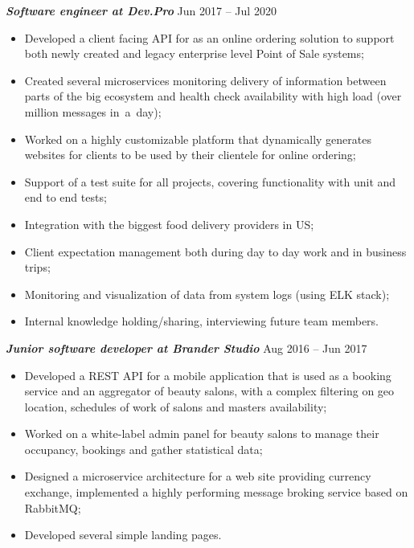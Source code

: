 \documentclass[margin, 10pt]{res} %
\begin{document}
\begin{resume}
{\sl \bf  Software engineer at Dev.Pro } \hfill Jun 2017 -- Jul 2020
\vspace{3px}
 \begin{itemize}
 \item Developed a client facing API for as an online ordering solution to support both newly created and legacy enterprise level Point of Sale systems;
 \item Created several microservices monitoring delivery of information between parts of the big ecosystem and health check availability with high load (over million messages in~a~day);
 \item Worked on a highly customizable platform that dynamically generates websites for clients to be used by their clientele for online ordering;
 \item Support of a test suite for all projects, covering functionality with unit and end to end tests;
 \item Integration with the biggest food delivery providers in US;
 \item Client expectation management both during day to day work and in business trips;
 \item Monitoring and visualization of data from system logs (using ELK stack);
 \item Internal knowledge holding/sharing, interviewing future team members.
\end{itemize}

{\sl \bf Junior software developer at Brander Studio} \hfill Aug 2016 -- Jun 2017
\vspace{3px}
\begin{itemize}
 \item Developed a REST API  for a mobile application that is used as a booking service and an aggregator of beauty salons, with a complex filtering on geo location, schedules of work of salons and masters availability;
 \item Worked on a white-label admin panel for beauty salons to manage their occupancy, bookings and gather statistical data;
 \item Designed a microservice architecture for a web site providing currency exchange, implemented a highly performing message broking service based on RabbitMQ;
 \item Developed several simple landing pages.
\end{itemize}


\end{resume}
\end{document}
